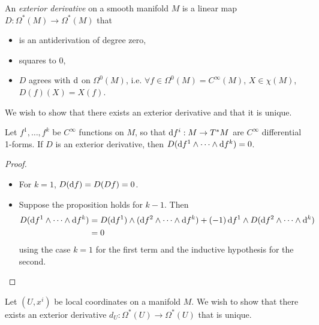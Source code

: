 \begin{defn}
An \emph{exterior derivative} on a smooth manifold $M$ is a linear map
$D: \Omega^\ast(M) \to \Omega^\ast(M)$ that
\begin{itemize}
  \item{is an antiderivation of degree zero,}
  \item{squares to 0,}
  \item{
    $D$ agrees with $\mathop{}\!\mathrm{d}$ on $\Omega^0(M)$, i.e.
    $\forall f \in \Omega^0(M) = C^\infty(M)$,
    $X \in \chi(M)$,
    $D(f)(X) = X(f)$.
  }
\end{itemize}
\end{defn}

We wish to show that there exists an exterior derivative and that it
is unique.

\begin{lemma}
Let $f^1, \dots, f^k$ be $C^\infty$ functions on $M$, so that
$\mathop{}\!\mathrm{d} f^i : M \to T^\ast M$ are $C^\infty$ differential 1-forms. If
$D$ is an exterior derivative, then
$D(\mathop{}\!\mathrm{d} f^1 \wedge \cdots \wedge \mathop{}\!\mathrm{d} f^k) = 0$.
\end{lemma}

\begin{proof}
\begin{itemize}
  \item{
    For $k = 1$, $D(\mathop{}\!\mathrm{d} f) = D(D f) = 0$.
  }
  \item{
    Suppose the proposition holds for $k - 1$. Then
    \begin{align*}
       D(\dif f^1 \wedge \cdots \wedge \dif f^k)
    &= D(\dif f^1) \wedge (\dif f^2 \wedge \cdots \wedge \dif f^k)
     + (-1) \dif f^1 \wedge D(\dif f^2 \wedge \cdots \wedge \dif ^k)
      \\
    &= 0
    \end{align*}
    using the case $k = 1$ for the first term and the inductive
    hypothesis for the second.
  }
\end{itemize}
\end{proof}

Let $(U, x^i)$ be local coordinates on a manifold $M$. We wish to show
that there exists an exterior derivative
$d_U : \Omega^\ast(U) \to \Omega^\ast(U)$ that is unique.

